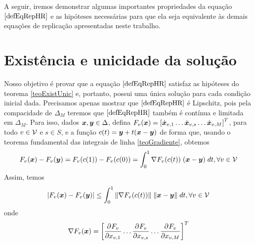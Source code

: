 A seguir, iremos demonstrar algumas importantes propriedades da equação $\eqref{defEqRepHR}$ e as hipóteses necessárias para que ela seja equivalente às demais equações de replicação apresentadas neste trabalho.


\section{Existência e unicidade da solução}

Nosso objetivo é provar que a equação $\eqref{defEqRepHR}$ satisfaz as hipóteses do teorema \ref{teoExistUnic} e, portanto, possui uma única solução para cada condição inicial dada. Precisamos apenas mostrar que $\eqref{defEqRepHR}$ é Lipschitz, pois pela compacidade de $\Delta_M$ teremos que $\eqref{defEqRepHR}$ também é contínua e limitada em $\Delta_M$. Para isso, dados $\boldsymbol{x},\boldsymbol{y}\in\Delta$, defina $F_v(\boldsymbol{x})=\left[ \dot{\boldsymbol{x}}_{v,1} \dots \dot{\boldsymbol{x}}_{v,s} \dots \dot{\boldsymbol{x}}_{v,M}\right]^T$, para todo $v\in\mathcal{V}$ e $s\in S$, e a função $c(t)=\boldsymbol{y}+t(\boldsymbol{x}-\boldsymbol{y})$ de forma que, usando o teorema fundamental das integrais de linha \ref{teoGradiente}, obtemos
\begin{equation}
    F_v(\boldsymbol{x})-F_v(\boldsymbol{y})=F_v(c(1))-F_v(c(0))=\int_0^1 \nabla F_v(c(t)) \; (\boldsymbol{x}-\boldsymbol{y}) \; dt , \forall v\in\mathcal{V}
\end{equation}
Assim, temos
\begin{equation}
    \label{ineqLipschitz}
    |F_v(\boldsymbol{x})-F_v(\boldsymbol{y})|\leq\int_0^1 \|\nabla F_v(c(t))\| \; \|\boldsymbol{x}-\boldsymbol{y}\| \; dt, \forall v\in\mathcal{V}
\end{equation}
onde
\begin{equation}
    \nabla F_v(\boldsymbol{x})=\left[ \frac{\partial^{}F_v}{\partial {x_{v,1}}^{}} \dots \frac{\partial^{}F_v}{\partial {x_{v,s}}^{}} \dots \frac{\partial^{}F_v}{\partial {x_{v,M}}^{}} \right]^T
\end{equation}

